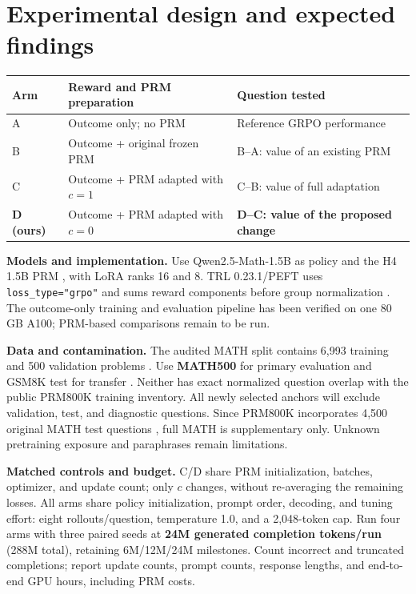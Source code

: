 \documentclass{article}
\begin{document}
\section{Experimental design and expected findings}
\begin{center}
\small
\renewcommand{\arraystretch}{1.12}
\begin{tabularx}{\linewidth}{@{}l L L@{}}
\toprule
\textbf{Arm} & \textbf{Reward and PRM preparation} & \textbf{Question tested} \\
\midrule
A & Outcome only; no PRM & Reference GRPO performance \\
B & Outcome + original frozen PRM & B--A: value of an existing PRM \\
C & Outcome + PRM adapted with $c=1$ & C--B: value of full adaptation \\
\textbf{D (ours)} & Outcome + PRM adapted with $c=0$ & \textbf{D--C: value of the proposed change} \\
\bottomrule
\end{tabularx}
\end{center}
\textbf{Models and implementation.} Use Qwen2.5-Math-1.5B as policy and the H4 1.5B PRM \citep{h4prm}, with LoRA ranks 16 and 8. TRL 0.23.1/PEFT uses \texttt{loss\_type="grpo"} and sums reward components before group normalization \citep{trl}. The outcome-only training and evaluation pipeline has been verified on one 80\,GB A100; PRM-based comparisons remain to be run.

\textbf{Data and contamination.} The audited MATH split contains 6,993 training and 500 validation problems \citep{hendrycks2021}. Use \textbf{MATH500} for primary evaluation and GSM8K test for transfer \citep{cobbe2021}. Neither has exact normalized question overlap with the public PRM800K training inventory. All newly selected anchors will exclude validation, test, and diagnostic questions. Since PRM800K incorporates 4,500 original MATH test questions \citep{prmdata}, full MATH is supplementary only. Unknown pretraining exposure and paraphrases remain limitations.

\textbf{Matched controls and budget.} C/D share PRM initialization, batches, optimizer, and update count; only $c$ changes, without re-averaging the remaining losses. All arms share policy initialization, prompt order, decoding, and tuning effort: eight rollouts/question, temperature 1.0, and a 2,048-token cap. Run four arms with three paired seeds at \textbf{24M generated completion tokens/run} (288M total), retaining 6M/12M/24M milestones. Count incorrect and truncated completions; report update counts, prompt counts, response lengths, and end-to-end GPU hours, including PRM costs.
\end{document}
